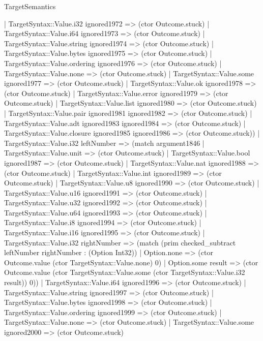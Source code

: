 \begin{lexlean}{TargetSemantics}
\begin{semanticmodule}
{              | TargetSyntax::Value.i32 ignored1972 => (ctor Outcome.stuck)
              | TargetSyntax::Value.i64 ignored1973 => (ctor Outcome.stuck)
              | TargetSyntax::Value.string ignored1974 => (ctor Outcome.stuck)
              | TargetSyntax::Value.bytes ignored1975 => (ctor Outcome.stuck)
              | TargetSyntax::Value.ordering ignored1976 => (ctor Outcome.stuck)
              | TargetSyntax::Value.none => (ctor Outcome.stuck)
              | TargetSyntax::Value.some ignored1977 => (ctor Outcome.stuck)
              | TargetSyntax::Value.ok ignored1978 => (ctor Outcome.stuck)
              | TargetSyntax::Value.error ignored1979 => (ctor Outcome.stuck)
              | TargetSyntax::Value.list ignored1980 => (ctor Outcome.stuck)
              | TargetSyntax::Value.pair ignored1981 ignored1982 => (ctor Outcome.stuck)
              | TargetSyntax::Value.adt ignored1983 ignored1984 => (ctor Outcome.stuck)
              | TargetSyntax::Value.closure ignored1985 ignored1986 => (ctor Outcome.stuck))
            | TargetSyntax::Value.i32 leftNumber => (match argument1846
              | TargetSyntax::Value.unit => (ctor Outcome.stuck)
              | TargetSyntax::Value.bool ignored1987 => (ctor Outcome.stuck)
              | TargetSyntax::Value.nat ignored1988 => (ctor Outcome.stuck)
              | TargetSyntax::Value.int ignored1989 => (ctor Outcome.stuck)
              | TargetSyntax::Value.u8 ignored1990 => (ctor Outcome.stuck)
              | TargetSyntax::Value.u16 ignored1991 => (ctor Outcome.stuck)
              | TargetSyntax::Value.u32 ignored1992 => (ctor Outcome.stuck)
              | TargetSyntax::Value.u64 ignored1993 => (ctor Outcome.stuck)
              | TargetSyntax::Value.i8 ignored1994 => (ctor Outcome.stuck)
              | TargetSyntax::Value.i16 ignored1995 => (ctor Outcome.stuck)
              | TargetSyntax::Value.i32 rightNumber => (match (prim checked_subtract leftNumber rightNumber : (Option Int32))
                | Option.none => (ctor Outcome.value (ctor TargetSyntax::Value.none) 0)
                | Option.some result => (ctor Outcome.value (ctor TargetSyntax::Value.some (ctor TargetSyntax::Value.i32 result)) 0))
              | TargetSyntax::Value.i64 ignored1996 => (ctor Outcome.stuck)
              | TargetSyntax::Value.string ignored1997 => (ctor Outcome.stuck)
              | TargetSyntax::Value.bytes ignored1998 => (ctor Outcome.stuck)
              | TargetSyntax::Value.ordering ignored1999 => (ctor Outcome.stuck)
              | TargetSyntax::Value.none => (ctor Outcome.stuck)
              | TargetSyntax::Value.some ignored2000 => (ctor Outcome.stuck)
}
\end{semanticmodule}
\end{lexlean}
